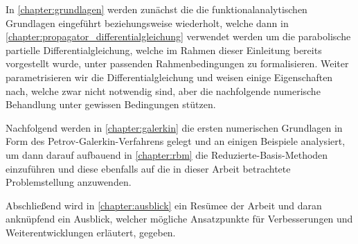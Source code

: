 In \cref{chapter:grundlagen} werden zunächst die die funktionalanalytischen Grundlagen eingeführt beziehungsweise wiederholt, welche dann in \cref{chapter:propagator_differentialgleichung} verwendet werden um die parabolische partielle Differentialgleichung, welche im Rahmen dieser Einleitung bereits vorgestellt wurde, unter passenden Rahmenbedingungen zu formalisieren.
Weiter parametrisieren wir die Differentialgleichung und weisen einige Eigenschaften nach, welche zwar nicht notwendig sind, aber die nachfolgende numerische Behandlung unter gewissen Bedingungen stützen.

Nachfolgend werden in \cref{chapter:galerkin} die ersten numerischen Grundlagen in Form des Petrov-Galerkin-Verfahrens gelegt und an einigen Beispiele analysiert, um dann darauf aufbauend in \cref{chapter:rbm} die Reduzierte-Basis-Methoden einzuführen und diese ebenfalls auf die in dieser Arbeit betrachtete Problemstellung anzuwenden.

Abschließend wird in \cref{chapter:ausblick} ein Resümee der Arbeit und daran anknüpfend ein Ausblick, welcher mögliche Ansatzpunkte für Verbesserungen und Weiterentwicklungen erläutert, gegeben.



